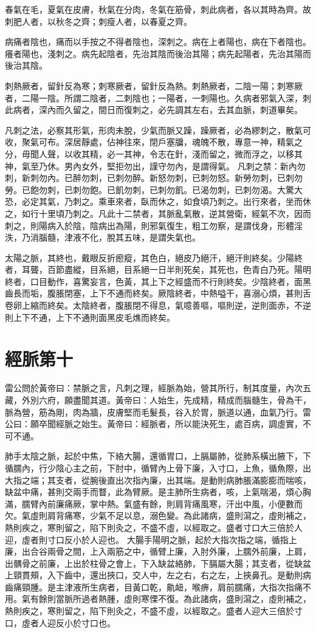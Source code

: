 春氣在毛，夏氣在皮膚，秋氣在分肉，冬氣在筋骨，刺此病者，各以其時為齊。故刺肥人者，以秋冬之齊；刺瘦人者，以春夏之齊。

病痛者陰也，痛而以手按之不得者陰也，深刺之。病在上者陽也，病在下者陰也。癢者陽也，淺刺之。病先起陰者，先治其陰而後治其陽；病先起陽者，先治其陽而後治其陰。

刺熱厥者，留針反為寒；刺寒厥者，留針反為熱。刺熱厥者，二陰一陽；刺寒厥者，二陽一陰。所謂二陰者，二刺陰也；一陽者，一刺陽也。久病者邪氣入深，刺此病者，深內而久留之，間日而復刺之，必先調其左右，去其血脈，刺道畢矣。

凡刺之法，必察其形氣，形肉未脫，少氣而脈又躁，躁厥者，必為繆刺之，散氣可收，聚氣可布。深居靜處，佔神往來，閉戶塞牖，魂魄不散，專意一神，精氣之分，毋聞人聲，以收其精，必一其神，令志在針，淺而留之，微而浮之，以移其神，氣至乃休。男內女外，堅拒勿出，謹守勿內，是謂得氣。
凡刺之禁：新內勿刺，新刺勿內。已醉勿刺，已刺勿醉。新怒勿刺，已刺勿怒。新勞勿刺，已刺勿勞。已飽勿刺，已刺勿飽。已飢勿刺，已刺勿飢。已渴勿刺，已刺勿渴。大驚大恐，必定其氣，乃刺之。乘車來者，臥而休之，如食頃乃刺之。出行來者，坐而休之，如行十里頃乃刺之。凡此十二禁者，其脈亂氣散，逆其營衛，經氣不次，因而刺之，則陽病入於陰，陰病出為陽，則邪氣復生，粗工勿察，是謂伐身，形體淫泆，乃消腦髓，津液不化，脫其五味，是謂失氣也。

太陽之脈，其終也，戴眼反折瘛瘲，其色白，絕皮乃絕汗，絕汗則終矣。少陽終者，耳聾，百節盡縱，目系絕，目系絕一日半則死矣，其死也，色青白乃死。陽明終者，口目動作，喜驚妄言，色黃，其上下之經盛而不行則終矣。少陰終者，面黑齒長而垢，腹脹閉塞，上下不通而終矣。厥陰終者，中熱嗌干，喜溺心煩，甚則舌卷卵上縮而終矣。太陰終者，腹脹閉不得息，氣噫善嘔，嘔則逆，逆則面赤，不逆則上下不通，上下不通則面黑皮毛燋而終矣。

\section{經脈第十}

雷公問於黃帝曰：禁脈之言，凡刺之理，經脈為始，營其所行，制其度量，內次五藏，外別六府，願盡聞其道。黃帝曰：人始生，先成精，精成而腦髓生，骨為干，脈為營，筋為剛，肉為牆，皮膚堅而毛髮長，谷入於胃，脈道以通，血氣乃行。雷公曰：願卒聞經脈之始生。黃帝曰：經脈者，所以能決死生，處百病，調虛實，不可不通。

肺手太陰之脈，起於中焦，下絡大腸，還循胃口，上膈屬肺，從肺系橫出腋下，下循臑內，行少陰心主之前，下肘中，循臂內上骨下廉，入寸口，上魚，循魚際，出大指之端；其支者，從腕後直出次指內廉，出其端。是動則病肺脹滿膨膨而喘咳，缺盆中痛，甚則交兩手而瞀，此為臂厥。是主肺所生病者，咳，上氣喘渴，煩心胸滿，臑臂內前廉痛厥，掌中熱。氣盛有餘，則肩背痛風寒，汗出中風，小便數而欠。氣虛則肩背痛寒，少氣不足以息，溺色變。為此諸病，盛則瀉之，虛則補之，熱則疾之，寒則留之，陷下則灸之，不盛不虛，以經取之。盛者寸口大三倍於人迎，虛者則寸口反小於人迎也。
大腸手陽明之脈，起於大指次指之端，循指上廉，出合谷兩骨之間，上入兩筋之中，循臂上廉，入肘外廉，上臑外前廉，上肩，出髃骨之前廉，上出於柱骨之會上，下入缺盆絡肺，下膈屬大腸；其支者，從缺盆上頸貫頰，入下齒中，還出挾口，交人中，左之右，右之左，上挾鼻孔。是動則病齒痛頸腫。是主津液所生病者，目黃口乾，鼽衄，喉痹，肩前臑痛，大指次指痛不用。氣有餘則當脈所過者熱腫，虛則寒慄不復。為此諸病，盛則瀉之，虛則補之，熱則疾之，寒則留之，陷下則灸之，不盛不虛，以經取之。盛者人迎大三倍於寸口，虛者人迎反小於寸口也。

